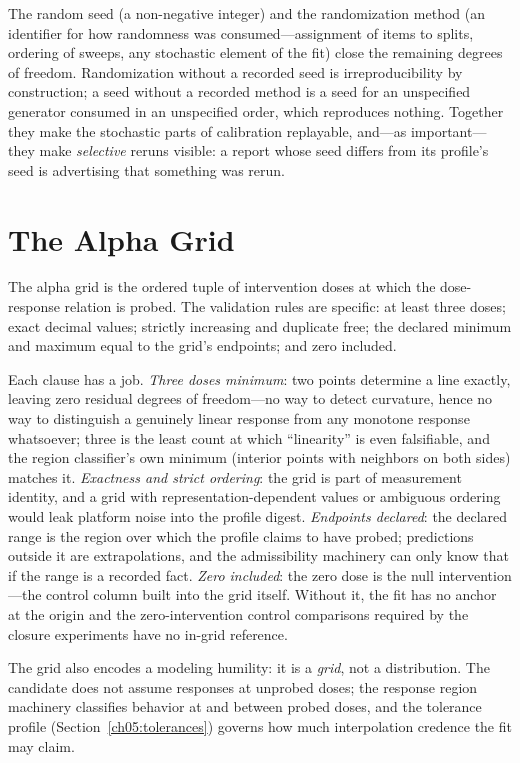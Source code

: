 The random seed (a non-negative integer) and the randomization method (an
identifier for how randomness was consumed---assignment of items to splits,
ordering of sweeps, any stochastic element of the fit) close the remaining
degrees of freedom. Randomization without a recorded seed is
irreproducibility by construction; a seed without a recorded method is a
seed for an unspecified generator consumed in an unspecified order, which
reproduces nothing. Together they make the stochastic parts of calibration
replayable, and---as important---they make \emph{selective} reruns visible:
a report whose seed differs from its profile's seed is advertising that
something was rerun.

\section{The Alpha Grid}\label{ch05:alphagrid}

The alpha grid is the ordered tuple of intervention doses at which the
dose-response relation is probed. The validation rules are specific: at
least three doses; exact decimal values; strictly increasing and duplicate
free; the declared minimum and maximum equal to the grid's endpoints; and
zero included.

Each clause has a job. \emph{Three doses minimum}: two points determine a
line exactly, leaving zero residual degrees of freedom---no way to detect
curvature, hence no way to distinguish a genuinely linear response from any
monotone response whatsoever; three is the least count at which
``linearity'' is even falsifiable, and the region classifier's own minimum
(interior points with neighbors on both sides) matches it. \emph{Exactness
and strict ordering}: the grid is part of measurement identity, and a grid
with representation-dependent values or ambiguous ordering would leak
platform noise into the profile digest. \emph{Endpoints declared}: the
declared range is the region over which the profile claims to have probed;
predictions outside it are extrapolations, and the admissibility machinery
can only know that if the range is a recorded fact. \emph{Zero included}:
the zero dose is the null intervention---the control column built into the
grid itself. Without it, the fit has no anchor at the origin and the
zero-intervention control comparisons required by the closure experiments
have no in-grid reference.

The grid also encodes a modeling humility: it is a \emph{grid}, not a
distribution. The candidate does not assume responses at unprobed doses; the
response region machinery classifies behavior at and between probed doses,
and the tolerance profile (Section~\ref{ch05:tolerances}) governs how much
interpolation credence the fit may claim.

